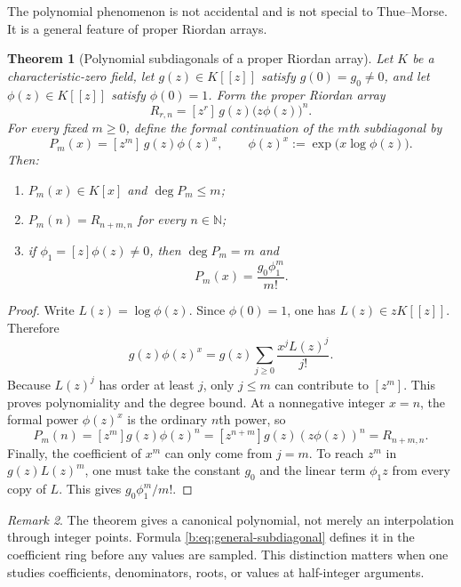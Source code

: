 \documentclass[11pt,a4paper,oneside,openany]{book}
\numberwithin{equation}{chapter}
\newtheorem{theorem}{Theorem}[chapter]
\theoremstyle{definition}
\theoremstyle{remark}
\newtheorem{remark}[theorem]{Remark}
\newcommand{\N}{\mathbb N}
\newcommand{\coeff}[2]{[z^{#1}]\,#2}
\begin{document}
The polynomial phenomenon is not accidental and is not special to
Thue--Morse.  It is a general feature of proper Riordan arrays.

\begin{theorem}[Polynomial subdiagonals of a proper Riordan array]
\label{b:thm:general-riordan-diagonal}
Let $K$ be a characteristic-zero field, let
$g(z)\in K[[z]]$ satisfy $g(0)=g_0\ne0$, and let
$\phi(z)\in K[[z]]$ satisfy $\phi(0)=1$.  Form the proper Riordan array
\[
 R_{r,n}=\coeff{r}{g(z)\bigl(z\phi(z)\bigr)^n}.
\]
For every fixed $m\ge0$, define the formal continuation of the $m$th
subdiagonal by
\begin{equation}
 P_m(x)=\coeff{m}{g(z)\phi(z)^x},
 \qquad
 \phi(z)^x:=\exp\!\bigl(x\log\phi(z)\bigr).
 \label{b:eq:general-subdiagonal}
\end{equation}
Then:
\begin{enumerate}
 \item $P_m(x)\in K[x]$ and $\deg P_m\le m$;
 \item $P_m(n)=R_{n+m,n}$ for every $n\in\N$;
 \item if $\phi_1=[z]\phi(z)\ne0$, then $\deg P_m=m$ and
 \begin{equation}
  [x^m]P_m(x)=\frac{g_0\phi_1^m}{m!}.
  \label{b:eq:general-leading}
 \end{equation}
\end{enumerate}
\end{theorem}

\begin{proof}
Write $L(z)=\log\phi(z)$.  Since $\phi(0)=1$, one has
$L(z)\in zK[[z]]$.  Therefore
\[
 g(z)\phi(z)^x
 =g(z)\sum_{j\ge0}\frac{x^jL(z)^j}{j!}.
\]
Because $L(z)^j$ has order at least $j$, only $j\le m$ can contribute to
$[z^m]$.  This proves polynomiality and the degree bound.  At a
nonnegative integer $x=n$, the formal power $\phi(z)^x$ is the ordinary
$n$th power, so
\[
 P_m(n)=[z^m]g(z)\phi(z)^n
       =[z^{n+m}]g(z)(z\phi(z))^n
       =R_{n+m,n}.
\]
Finally, the coefficient of $x^m$ can only come from $j=m$.  To reach
$z^m$ in $g(z)L(z)^m$, one must take the constant $g_0$ and the linear term
$\phi_1z$ from every copy of $L$.  This gives
$g_0\phi_1^m/m!$.
\end{proof}

\begin{remark}
The theorem gives a canonical polynomial, not merely an interpolation through
integer points.  Formula \eqref{b:eq:general-subdiagonal} defines it in the
coefficient ring before any values are sampled.  This distinction matters
when one studies coefficients, denominators, roots, or values at half-integer
arguments.
\end{remark}
\end{document}
